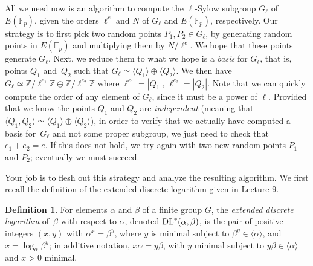 \documentclass[11pt]{article}
\newcommand{\Fp}{\mathbb{F}_p}
\newcommand{\Z}{\mathbb{Z}}
\newcommand{\DL}{{\rm DL}^*}
\theoremstyle{definition}
\newtheorem*{definition*}{Definition}
\begin{document}
All we need now is an algorithm to compute the $\ell$-Sylow subgroup $G_\ell$ of $E(\Fp)$, given the orders $\ell^e$ and $N$ of $G_\ell$ and $E(\Fp)$, respectively.
Our strategy is to first pick two random points $P_1,P_2\in G_\ell$, by generating random points in $E(\Fp)$ and multiplying them by $N/\ell^e$.  We hope that these points generate $G_\ell$.  Next, we reduce them to what we hope is a \emph{basis} for $G_\ell$, that is, points $Q_1$ and~$Q_2$ such that $G_\ell\simeq\langle Q_1\rangle\oplus\langle Q_2\rangle$.
We then have $G_\ell\simeq \Z/\ell^{e_1}\Z\oplus\Z/\ell^{e_2}\Z$ where $\ell^{e_1}=|Q_1|$, $\ell^{e_2}=|Q_2|$.
Note that we can quickly compute the order of any element of $G_\ell$, since it must be a power of $\ell$.
Provided that we know the points $Q_1$ and $Q_2$ are \emph{independent} (meaning that $\langle Q_1,Q_2\rangle\simeq\langle Q_1\rangle\oplus\langle Q_2\rangle$), in order to verify that we actually have computed a basis for~$G_\ell$ and not some proper subgroup, we just need to check that $e_1+e_2=e$.
If this does not hold, we try again with two new random points $P_1$ and $P_2$; eventually we must succeed. \medskip

Your job is to flesh out this strategy and analyze the resulting algorithm.
We first recall the definition of the extended discrete logarithm given in Lecture 9.
\begin{definition*}
For elements $\alpha$ and $\beta$ of a finite group $G$, the \emph{extended discrete logarithm} of~$\beta$ with respect to $\alpha$, denoted $\DL(\alpha,\beta)$, is the pair of positive integers $(x,y)$ with $\alpha^x=\beta^y$, where $y$ is minimal subject to $\beta^y\in\langle\alpha\rangle$, and $x=\log_\alpha\beta^y$; in additive notation, $x\alpha=y\beta$, with $y$ minimal subject to $y\beta\in \langle \alpha\rangle$ and $x>0$ minimal.
\end{definition*}
\end{document}
